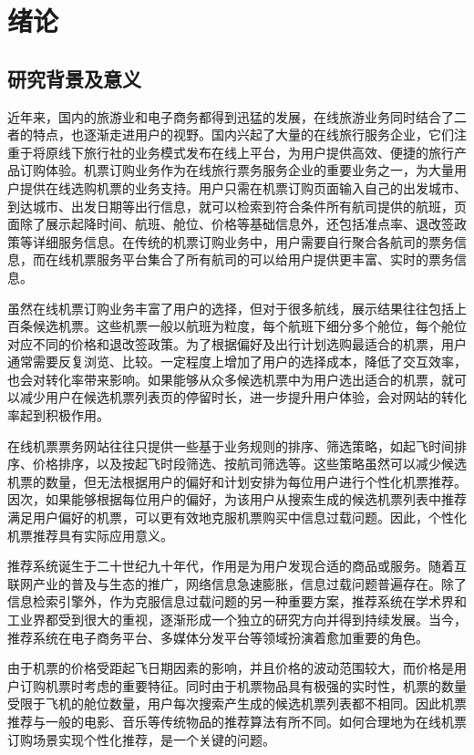 
\chapter{绪论 }
\label{chap:intro}


\section{研究背景及意义}
近年来，国内的旅游业和电子商务都得到迅猛的发展，在线旅游业务同时结合了二者的特点，也逐渐走进用户的视野。国内兴起了大量的在线旅行服务企业，它们注重于将原线下旅行社的业务模式发布在线上平台，为用户提供高效、便捷的旅行产品订购体验。机票订购业务作为在线旅行票务服务企业的重要业务之一，为大量用户提供在线选购机票的业务支持。用户只需在机票订购页面输入自己的出发城市、到达城市、出发日期等出行信息，就可以检索到符合条件所有航司提供的航班，页面除了展示起降时间、航班、舱位、价格等基础信息外，还包括准点率、退改签政策等详细服务信息。在传统的机票订购业务中，用户需要自行聚合各航司的票务信息，而在线机票服务平台集合了所有航司的可以给用户提供更丰富、实时的票务信息。

虽然在线机票订购业务丰富了用户的选择，但对于很多航线，展示结果往往包括上百条候选机票。这些机票一般以航班为粒度，每个航班下细分多个舱位，每个舱位对应不同的价格和退改签政策。为了根据偏好及出行计划选购最适合的机票，用户通常需要反复浏览、比较。一定程度上增加了用户的选择成本，降低了交互效率，也会对转化率带来影响。如果能够从众多候选机票中为用户选出适合的机票，就可以减少用户在候选机票列表页的停留时长，进一步提升用户体验，会对网站的转化率起到积极作用。

在线机票票务网站往往只提供一些基于业务规则的排序、筛选策略，如起飞时间排序、价格排序，以及按起飞时段筛选、按航司筛选等。这些策略虽然可以减少候选机票的数量，但无法根据用户的偏好和计划安排为每位用户进行个性化机票推荐。因次，如果能够根据每位用户的偏好，为该用户从搜索生成的候选机票列表中推荐满足用户偏好的机票，可以更有效地克服机票购买中信息过载问题。因此，个性化机票推荐具有实际应用意义。

推荐系统\cite{schafer1999recommender,konstan1997grouplens}诞生于二十世纪九十年代，作用是为用户发现合适的商品或服务。随着互联网产业的普及与生态的推广，网络信息急速膨胀，信息过载问题普遍存在。除了信息检索引擎外，作为克服信息过载问题的另一种重要方案，推荐系统在学术界和工业界都受到很大的重视，逐渐形成一个独立的研究方向并得到持续发展。当今，推荐系统在电子商务平台、多媒体分发平台等领域扮演着愈加重要的角色。

由于机票的价格受距起飞日期因素的影响，并且价格的波动范围较大，而价格是用户订购机票时考虑的重要特征。同时由于机票物品具有极强的实时性，机票的数量受限于飞机的舱位数量，用户每次搜索产生成的候选机票列表都不相同。因此机票推荐与一般的电影、音乐等传统物品的推荐算法有所不同。如何合理地为在线机票订购场景实现个性化推荐，是一个关键的问题。

